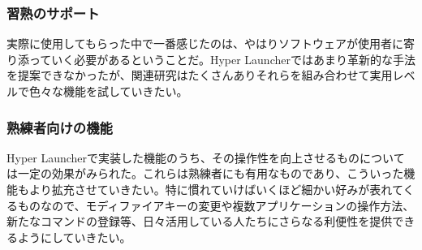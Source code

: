 \subsubsection{習熟のサポート}
実際に使用してもらった中で一番感じたのは、やはりソフトウェアが使用者に寄り添っていく必要があるということだ。Hyper Launcherではあまり革新的な手法を提案できなかったが、関連研究はたくさんありそれらを組み合わせて実用レベルで色々な機能を試していきたい。

\subsubsection{熟練者向けの機能}
Hyper Launcherで実装した機能のうち、その操作性を向上させるものについては一定の効果がみられた。これらは熟練者にも有用なものであり、こういった機能もより拡充させていきたい。特に慣れていけばいくほど細かい好みが表れてくるものなので、モディファイアキーの変更や複数アプリケーションの操作方法、新たなコマンドの登録等、日々活用している人たちにさらなる利便性を提供できるようにしていきたい。